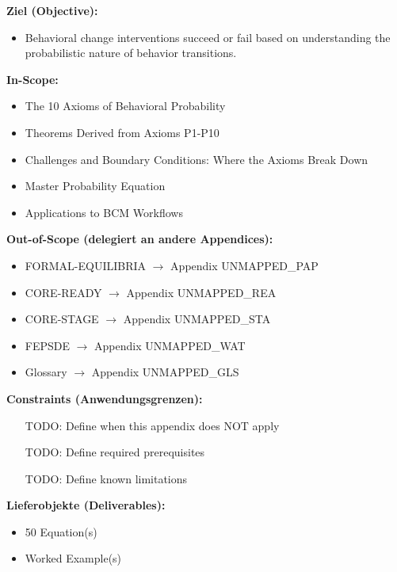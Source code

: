 \documentclass[11pt, a4paper]{article}
\begin{document}

\begin{tcolorbox}[
    colback=orange!5!white,
    colframe=orange!75!black,
    title={\textbf{Appendix Scope: Ziel / In-Scope / Out-of-Scope / Constraints}},
    fonttitle=\bfseries
]

\textbf{Ziel (Objective):}
\begin{itemize}[nosep]
    \item Behavioral change interventions succeed or fail based on understanding the probabilistic nature of behavior transitions.
\end{itemize}

\textbf{In-Scope:}
\begin{itemize}[nosep]
    \item The 10 Axioms of Behavioral Probability
    \item Theorems Derived from Axioms P1-P10
    \item Challenges and Boundary Conditions: Where the Axioms Break Down
    \item Master Probability Equation
    \item Applications to BCM Workflows
\end{itemize}

\textbf{Out-of-Scope (delegiert an andere Appendices):}
\begin{itemize}[nosep]
    \item FORMAL-EQUILIBRIA $\rightarrow$ Appendix UNMAPPED_PAP
    \item CORE-READY $\rightarrow$ Appendix UNMAPPED_REA
    \item CORE-STAGE $\rightarrow$ Appendix UNMAPPED_STA
    \item FEPSDE $\rightarrow$ Appendix UNMAPPED_WAT
    \item Glossary $\rightarrow$ Appendix UNMAPPED_GLS
\end{itemize}

\textbf{Constraints (Anwendungsgrenzen):}
\begin{itemize}[nosep]
    \item [TODO: Define when this appendix does NOT apply]
    \item [TODO: Define required prerequisites]
    \item [TODO: Define known limitations]
\end{itemize}

\textbf{Lieferobjekte (Deliverables):}
\begin{itemize}[nosep]
    \item 50 Equation(s)
    \item Worked Example(s)
\end{itemize}

\end{tcolorbox}
\end{document}
